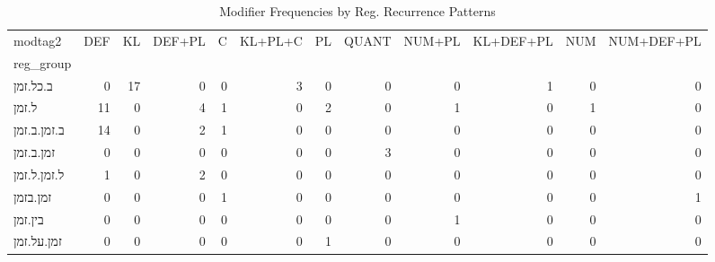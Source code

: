 \begin{table}[htbp!]
\centering
\caption{Modifier Frequencies by Reg. Recurrence Patterns}
\label{table:regrecmod_ct}
\begin{adjustbox}{width=1\textwidth}
\begin{tabular}{lrrrrrrrrrrr}
\toprule
modtag2 &  DEF &  KL &  DEF+PL &  C &  KL+PL+C &  PL &  QUANT &  NUM+PL &  KL+DEF+PL &  NUM &  NUM+DEF+PL \\
reg\_group   &      &     &         &    &          &     &        &         &            &      &             \\
\midrule
ב.כל.זמן    &    0 &  17 &       0 &  0 &        3 &   0 &      0 &       0 &          1 &    0 &           0 \\
ל.זמן       &   11 &   0 &       4 &  1 &        0 &   2 &      0 &       1 &          0 &    1 &           0 \\
ב.זמן.ב.זמן &   14 &   0 &       2 &  1 &        0 &   0 &      0 &       0 &          0 &    0 &           0 \\
זמן.ב.זמן   &    0 &   0 &       0 &  0 &        0 &   0 &      3 &       0 &          0 &    0 &           0 \\
ל.זמן.ל.זמן &    1 &   0 &       2 &  0 &        0 &   0 &      0 &       0 &          0 &    0 &           0 \\
זמן.בזמן    &    0 &   0 &       0 &  1 &        0 &   0 &      0 &       0 &          0 &    0 &           1 \\
בין.זמן     &    0 &   0 &       0 &  0 &        0 &   0 &      0 &       1 &          0 &    0 &           0 \\
זמן.על.זמן  &    0 &   0 &       0 &  0 &        0 &   1 &      0 &       0 &          0 &    0 &           0 \\
\bottomrule
\end{tabular}
\end{adjustbox}
\end{table}
